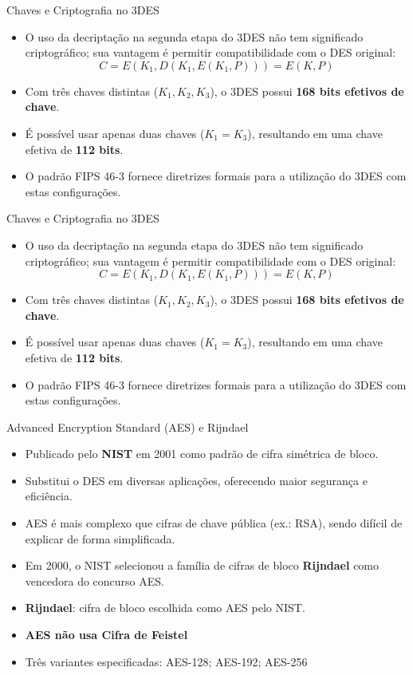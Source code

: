 \begin{frame}{Chaves e Criptografia no 3DES}
    \begin{itemize}
        \item O uso da decriptação na segunda etapa do 3DES não tem significado criptográfico;
              sua vantagem é permitir compatibilidade com o DES original:
              \[
                  C = E(K_1, D(K_1, E(K_1, P))) = E(K, P)
              \]
        \item Com três chaves distintas ($K_1, K_2, K_3$), o 3DES possui \textbf{168 bits efetivos de chave}.
        \item É possível usar apenas duas chaves ($K_1 = K_3$), resultando em uma chave efetiva de \textbf{112 bits}.
        \item O padrão FIPS 46-3 fornece diretrizes formais para a utilização do 3DES com estas configurações.
    \end{itemize}
\end{frame}

\begin{frame}{Chaves e Criptografia no 3DES}
    \begin{itemize}
        \item O uso da decriptação na segunda etapa do 3DES não tem significado criptográfico;
              sua vantagem é permitir compatibilidade com o DES original:
              \[
                  C = E(K_1, D(K_1, E(K_1, P))) = E(K, P)
              \]
        \item Com três chaves distintas ($K_1, K_2, K_3$), o 3DES possui \textbf{168 bits efetivos de chave}.
        \item É possível usar apenas duas chaves ($K_1 = K_3$), resultando em uma chave efetiva de \textbf{112 bits}.
        \item O padrão FIPS 46-3 fornece diretrizes formais para a utilização do 3DES com estas configurações.
    \end{itemize}
\end{frame}

\begin{frame}{Advanced Encryption Standard (AES) e Rijndael}
    \begin{itemize}
        \item Publicado pelo \textbf{NIST} em 2001 como padrão de cifra simétrica de bloco.
        \item Substitui o DES em diversas aplicações, oferecendo maior segurança e eficiência.
        \item AES é mais complexo que cifras de chave pública (ex.: RSA), sendo difícil de explicar de forma simplificada.
        \item Em 2000, o NIST selecionou a família de cifras de bloco \textbf{Rijndael} como vencedora do concurso AES.
        \item \textbf{Rijndael}: cifra de bloco escolhida como AES pelo NIST.
        \item \textbf{AES não usa Cifra de Feistel}

        \item Três variantes especificadas: AES-128; AES-192; AES-256
    \end{itemize}
\end{frame}

